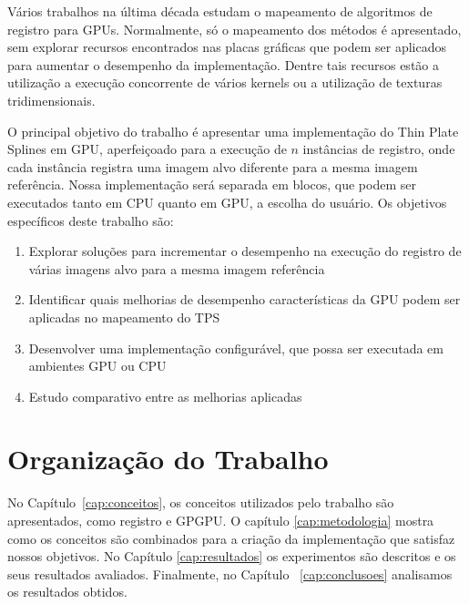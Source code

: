   Vários trabalhos na última década estudam o mapeamento de algoritmos de
registro para GPUs. Normalmente, só o mapeamento dos métodos é apresentado, sem
explorar recursos encontrados nas placas gráficas que podem ser aplicados para
aumentar o desempenho da implementação. Dentre tais recursos estão a utilização
a execução concorrente de vários kernels ou a utilização de texturas
tridimensionais.

  O principal objetivo do trabalho é apresentar uma implementação do Thin Plate
Splines em GPU, aperfeiçoado para a execução de $n$ instâncias de registro, onde
cada instância registra uma imagem alvo diferente para a mesma imagem referência.
Nossa implementação será separada em blocos, que podem ser executados tanto em
CPU quanto em GPU, a escolha do usuário. Os objetivos específicos deste
trabalho são:

\begin{enumerate}
	\item Explorar soluções para incrementar o desempenho na execução do registro
        de várias imagens alvo para a mesma imagem referência
	\item Identificar quais melhorias de desempenho características da GPU podem
        ser aplicadas no mapeamento do TPS
	\item Desenvolver uma implementação configurável, que possa ser executada
        em ambientes GPU ou CPU
  \item Estudo comparativo entre as melhorias aplicadas
\end{enumerate}

\section{Organização do Trabalho}
\label{sec:organizacao_trabalho}

No Capítulo~\ref{cap:conceitos}, os conceitos utilizados pelo trabalho
são apresentados, como registro e GPGPU. O capítulo \ref{cap:metodologia}
mostra como os conceitos são combinados para a criação da implementação que
satisfaz nossos objetivos. No Capítulo \ref{cap:resultados} os experimentos são
descritos e os seus resultados avaliados. Finalmente, no Capítulo
~\ref{cap:conclusoes} analisamos os resultados obtidos.
